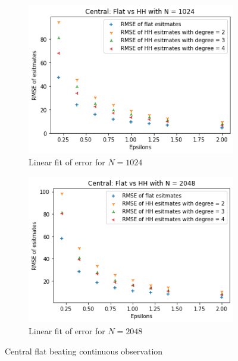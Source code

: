 \documentclass[11pt]{article}
\theoremstyle{definition}
\begin{document}
\begin{figure}[H]
\begin{subfigure}{.4\textwidth}
  \includegraphics[width=\linewidth]{figures/central_flat_hh/flat_beat_hh_N=1024.png}
  \caption{Linear fit of error for $N=1024$}
  \label{fig:39}
\end{subfigure}
\begin{subfigure}{.4\textwidth}
  \centering
  \includegraphics[width=\linewidth]{figures/central_flat_hh/flat_beat_hh_N=2048.png}
  \caption{Linear fit of error for $N=2048$}
  \label{fig:40}
\end{subfigure}
\caption{Central flat beating continuous observation}
\label{99}
\end{figure}
\end{document}
